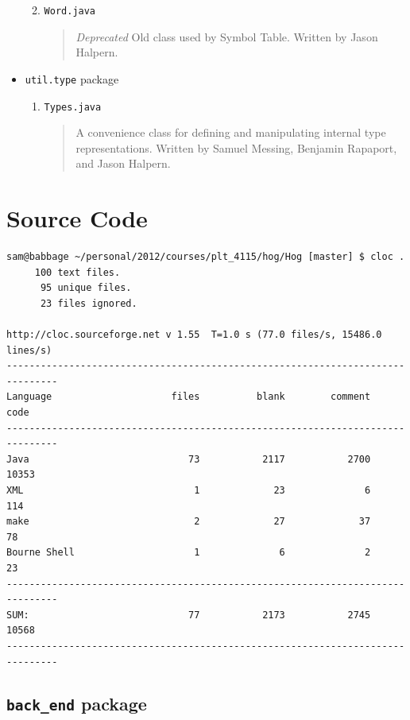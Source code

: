 \documentclass{report}
\begin{document}
\begin{itemize}
\begin{enumerate}
\begin{quotation}
\end{quotation}
\item \texttt{Word.java}
\begin{quotation}
\noindent \emph{Deprecated} Old class used by Symbol Table. Written by Jason Halpern. 
\end{quotation}
\end{enumerate} %
\item \texttt{util.type} package
\begin{enumerate}
\item \texttt{Types.java}
\begin{quotation}
\noindent A convenience class for defining and manipulating internal type
representations. Written by Samuel Messing, Benjamin Rapaport, and Jason Halpern.
\end{quotation}
\end{enumerate}
\end{itemize}  %

\chapter{Source Code}

\begin{verbatim}
sam@babbage ~/personal/2012/courses/plt_4115/hog/Hog [master] $ cloc .
     100 text files.
      95 unique files.                              
      23 files ignored.

http://cloc.sourceforge.net v 1.55  T=1.0 s (77.0 files/s, 15486.0 lines/s)
-------------------------------------------------------------------------------
Language                     files          blank        comment           code
-------------------------------------------------------------------------------
Java                            73           2117           2700          10353
XML                              1             23              6            114
make                             2             27             37             78
Bourne Shell                     1              6              2             23
-------------------------------------------------------------------------------
SUM:                            77           2173           2745          10568
-------------------------------------------------------------------------------

\end{verbatim}

\section{\texttt{back\_end} package}
\end{document}
